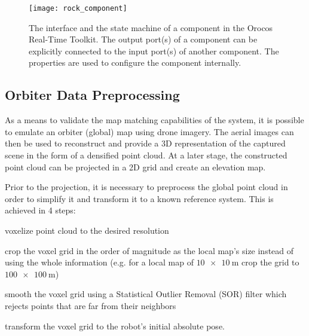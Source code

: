 \begin{figure}[h!]
    \centering
    \texttt{[image: rock\_component]}
    \decoRule
    \caption[ROCK component interface]{
        The interface and the state machine of a component in the Orocos
        Real-Time Toolkit. The output port(s) of a component can be explicitly
        connected to the input port(s) of another component. The properties
        are used to configure the component internally.
    }
    \label{fig:rock_component}
\end{figure}


\subsection{Orbiter Data Preprocessing}

As a means to validate the map matching capabilities of the system,
it is possible to emulate an orbiter (global) map using drone imagery.
The aerial images can then be used to reconstruct and provide a 3D
representation of the captured scene in the form of a densified point cloud.
At a later stage, the constructed point cloud can be projected in a 2D
grid and create an elevation map.

Prior to the projection, it is necessary to preprocess the global point cloud
in order to simplify it and transform it to a known reference system.
This is achieved in 4 steps:
\begin{enumerate*}[label=(\roman*)]
    \item voxelize point cloud to the desired resolution
    \item crop the voxel grid in the order of magnitude as the local map's
        size instead of using the whole information
        (e.g. for a local map of $\SI{10 x 10}{\m}$ crop the grid to
        $\SI{100 x 100}{\m}$)
    \item smooth the voxel grid using a Statistical Outlier Removal (SOR)
        filter which rejects points that are far from their neighbors
    \item transform the voxel grid to the robot's initial absolute pose.
\end{enumerate*}


